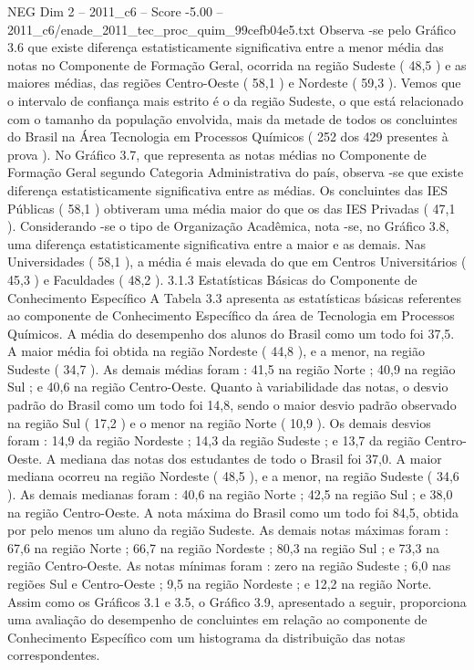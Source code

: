 \begin{textsample}{NEG Dim 2 – 2011\_c6 – Score -5.00 – 2011\_c6/enade\_2011\_tec\_proc\_quim\_99cefb04e5.txt}
Observa -se pelo Gráfico 3.6 que existe diferença estatisticamente significativa entre a menor média das notas no Componente de Formação Geral, ocorrida na região Sudeste ( 48,5 ) e as maiores médias, das regiões Centro-Oeste ( 58,1 ) e Nordeste ( 59,3 ).
Vemos que o intervalo de confiança mais estrito é o da região Sudeste, o que está relacionado com o tamanho da população envolvida, mais da metade de todos os concluintes do Brasil na Área Tecnologia em Processos Químicos ( 252 dos 429 presentes à prova ).
No Gráfico 3.7, que representa as notas médias no Componente de Formação Geral segundo Categoria Administrativa do país, observa -se que existe diferença estatisticamente significativa entre as médias.
Os concluintes das IES Públicas ( 58,1 ) obtiveram uma média maior do que os das IES Privadas ( 47,1 ).
Considerando -se o tipo de Organização Acadêmica, nota -se, no Gráfico 3.8, uma diferença estatisticamente significativa entre a maior e as demais.
Nas Universidades ( 58,1 ), a média é mais elevada do que em Centros Universitários ( 45,3 ) e Faculdades ( 48,2 ). 3.1.3 Estatísticas Básicas do Componente de Conhecimento Específico A Tabela 3.3 apresenta as estatísticas básicas referentes ao componente de Conhecimento Específico da área de Tecnologia em Processos Químicos.
A média do desempenho dos alunos do Brasil como um todo foi 37,5.
A maior média foi obtida na região Nordeste ( 44,8 ), e a menor, na região Sudeste ( 34,7 ).
As demais médias foram : 41,5 na região Norte ; 40,9 na região Sul ; e 40,6 na região Centro-Oeste.
Quanto à variabilidade das notas, o desvio padrão do Brasil como um todo foi 14,8, sendo o maior desvio padrão observado na região Sul ( 17,2 ) e o menor na região Norte ( 10,9 ).
Os demais desvios foram : 14,9 da região Nordeste ; 14,3 da região Sudeste ; e 13,7 da região Centro-Oeste.
A mediana das notas dos estudantes de todo o Brasil foi 37,0.
A maior mediana ocorreu na região Nordeste ( 48,5 ), e a menor, na região Sudeste ( 34,6 ).
As demais medianas foram : 40,6 na região Norte ; 42,5 na região Sul ; e 38,0 na região Centro-Oeste.
A nota máxima do Brasil como um todo foi 84,5, obtida por pelo menos um aluno da região Sudeste.
As demais notas máximas foram : 67,6 na região Norte ; 66,7 na região Nordeste ; 80,3 na região Sul ; e 73,3 na região Centro-Oeste.
As notas mínimas foram : zero na região Sudeste ; 6,0 nas regiões Sul e Centro-Oeste ; 9,5 na região Nordeste ; e 12,2 na região Norte.
Assim como os Gráficos 3.1 e 3.5, o Gráfico 3.9, apresentado a seguir, proporciona uma avaliação do desempenho de concluintes em relação ao componente de Conhecimento Específico com um histograma da distribuição das notas correspondentes.

\end{textsample}
